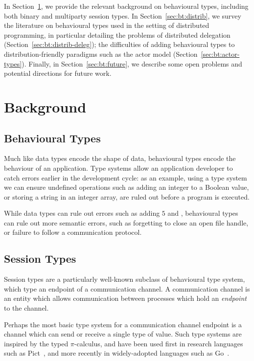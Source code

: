 \documentclass[
graybox,
envcountchap
]{svmult}
\begin{document}
\begin{bibunit}
  In Section~\ref{sec:bt:background}, we provide the relevant background on
  behavioural types, including both binary and multiparty session types. In
  Section~\ref{sec:bt:distrib}, we survey the literature on behavioural types
  used in the setting of distributed programming, in particular detailing the
  problems of distributed delegation (Section~\ref{sec:bt:distrib-deleg}); the
  difficulties of adding behavioural types to distribution-friendly paradigms
  such as the actor model (Section~\ref{sec:bt:actor-types}).
  Finally, in Section~\ref{sec:bt:future}, we describe some open problems
  and potential directions for future work.

  \section{Background}\label{sec:bt:background}
  \subsection{Behavioural Types}

  Much like data types encode the shape of data, behavioural types encode the
  behaviour of an application. Type systems allow an application developer to
  catch errors earlier in the development cycle: as an example, using a type
  system we can ensure undefined operations such as adding an integer to a
  Boolean value, or storing a string in an integer array, are ruled out before a
  program is executed.

  While data types can rule out errors such as adding $5$ and ,
  behavioural types can rule out more semantic errors, such as forgetting to
  close an open file handle, or failure to follow a communication protocol.


  \subsection{Session Types}
  Session types are a particularly well-known subclass of behavioural type
  system, which type an endpoint of a communication channel. A communication
  channel is an entity which allows communication between processes which hold
  an \emph{endpoint} to the channel.

  Perhaps the most basic type system for a communication channel endpoint is a
  channel which can send or receive a single type of value. Such type systems
  are inspired by the typed $\pi$-calculus, and have been used first in research
  languages such as Pict~\cite{PierceT00:pict}, and more recently in
  widely-adopted languages such as Go~\cite{DonovanK15:go}.


\end{bibunit}
\end{document}
